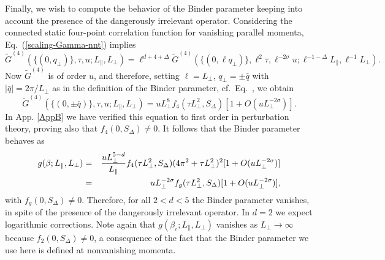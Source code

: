 \documentclass[12pt]{article}
\begin{document}
Finally, we wish to compute the behavior of the Binder parameter
keeping into account the presence of the dangerously irrelevant 
operator. Considering the connected static four-point correlation function 
for vanishing parallel momenta,
Eq.~(\ref{scaling-Gamma-nnt}) implies
\begin{equation}
\tilde{G}^{(4)} (\{(0,q_{\bot})\},\tau,u;L_{\|},L_{\bot}) = 
\ell^{d+4+\Delta} \tilde{G}^{(4)}   (\{(0,\ell q_{\bot})\}, 
\ell^{2} \tau,\ell^{-2\sigma} u;\ell^{-1-\Delta}L_{\|},\ell^{-1} L_{\bot}).
\end{equation}
Now $\tilde{G}^{(4)}$ is of order $u$, and therefore, setting $\ell = L_\bot$,
$q_\bot = \pm \bar{q}$ with $|\bar{q}| = 2\pi/L_\bot$ as in the definition of 
the Binder parameter, cf.~Eq.~, we obtain
\begin{equation}
\tilde{G}^{(4)}
(\{(0,\pm \bar{q})\},\tau,u;L_{\|},L_{\bot}) = 
  u L_\bot^8 f_4(\tau L_\bot^2, S_\Delta)
   [1 + O(u L_\bot^{-2\sigma})].
\label{tildeG4-u}
\end{equation}
In App. \ref{AppB} we have verified this equation to first order 
in perturbation theory, proving also that $f_4(0,S_\Delta) \not = 0$.
It follows that the Binder parameter behaves as 
\begin{eqnarray}
g(\beta;L_{\|},L_{\bot}) &=& {u L_\bot^{5-d}\over L_\|} 
f_4(\tau L_\bot^2, S_\Delta) (4 \pi^2 + \tau L_\bot^2)^2 
     [1 + O(u L_\bot^{-2\sigma})]
\nonumber \\
&=& u L_\bot^{-2\sigma} f_g(\tau L_\bot^2, S_\Delta) 
     [1 + O(u L_\bot^{-2\sigma})], 
\end{eqnarray}
with $f_g(0,S_\Delta)\not = 0$. Therefore, for all $2 < d < 5$ the Binder 
parameter vanishes, in spite of the presence of the dangerously irrelevant
operator. In $d=2$ we expect logarithmic corrections. 
Note again that $g(\beta_c;L_{\|},L_{\bot})$ vanishes as $L_\bot\to \infty$ 
because $f_2(0,S_\Delta) \not= 0 $, a consequence of the fact that 
the Binder parameter we use here is defined at nonvanishing momenta.
\end{document}
